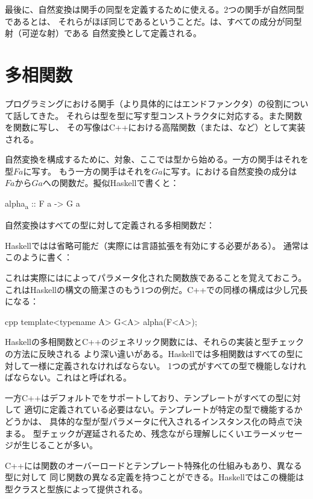 最後に、自然変換は関手の同型を定義するために使える。2つの関手が自然同型であるとは、
それらがほぼ同じであるということだ。は、すべての成分が同型射（可逆な射）である
自然変換として定義される。

\section{多相関数}

プログラミングにおける関手（より具体的にはエンドファンクタ）の役割について話してきた。
それらは型を型に写す型コンストラクタに対応する。また関数を関数に写し、
その写像はC++における高階関数（または、など）として実装される。

自然変換を構成するために、対象、ここでは型から始める。一方の関手はそれを型$F a$に写す。
もう一方の関手はそれを$G a$に写す。における自然変換の成分は
$F a$から$G a$への関数だ。擬似Haskellで書くと：

\begin{snipv}
alpha\textsubscript{a} :: F a -> G a
\end{snipv}
自然変換はすべての型に対して定義される多相関数だ：

Haskellではは省略可能だ（実際には言語拡張を有効にする必要がある）。
通常はこのように書く：

これは実際にはによってパラメータ化された関数族であることを覚えておこう。
これはHaskellの構文の簡潔さのもう1つの例だ。C++での同様の構成は少し冗長になる：

\begin{snip}{cpp}
template<typename A> G<A> alpha(F<A>);
\end{snip}
Haskellの多相関数とC++のジェネリック関数には、それらの実装と型チェックの方法に反映される
より深い違いがある。Haskellでは多相関数はすべての型に対して一様に定義されなければならない。
1つの式がすべての型で機能しなければならない。これはと呼ばれる。

一方C++はデフォルトでをサポートしており、テンプレートがすべての型に対して
適切に定義されている必要はない。テンプレートが特定の型で機能するかどうかは、
具体的な型が型パラメータに代入されるインスタンス化の時点で決まる。
型チェックが遅延されるため、残念ながら理解しにくいエラーメッセージが生じることが多い。

C++には関数のオーバーロードとテンプレート特殊化の仕組みもあり、異なる型に対して
同じ関数の異なる定義を持つことができる。Haskellではこの機能は型クラスと型族によって提供される。

